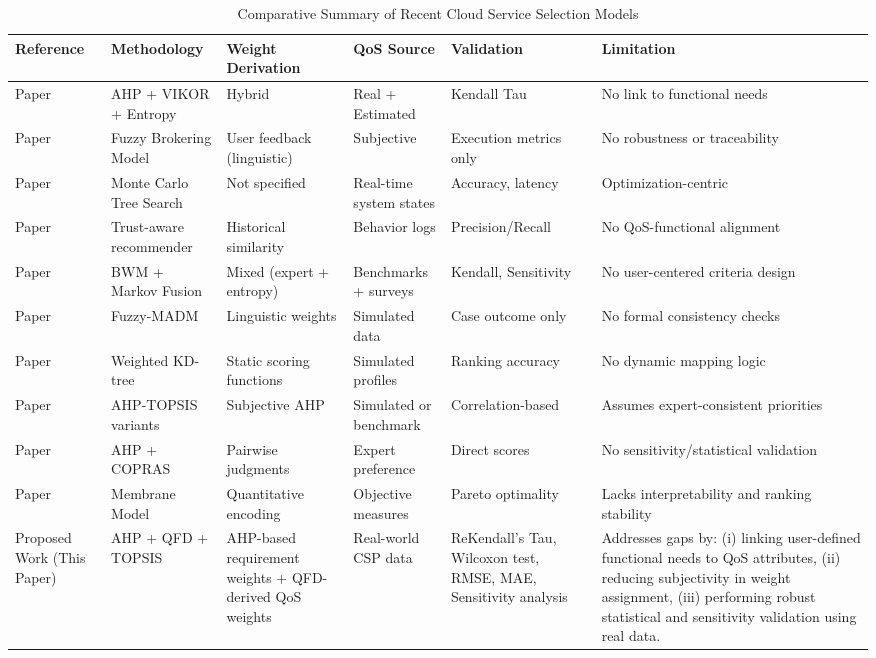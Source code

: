 \documentclass[twocolumn]{svjour3}
\begin{document}
\begin{table}[t]
\centering
\caption{Comparative Summary of Recent Cloud Service Selection Models}
\label{tab:comparison}
\scriptsize
\begin{tabular}{|p{2.9cm}|p{2.5cm}|p{2.1cm}|p{2.1cm}|p{2.3cm}|p{2.2cm}|}
\hline
\textbf{Reference} & \textbf{Methodology} & \textbf{Weight Derivation} & \textbf{QoS Source} & \textbf{Validation} & \textbf{Limitation} \\
\hline
Paper ~\cite{bhol2024machine} & AHP + VIKOR + Entropy & Hybrid & Real + Estimated & Kendall Tau & No link to functional needs \\
\hline
Paper~\cite{chauhan2025fbm} & Fuzzy Brokering Model & User feedback (linguistic) & Subjective & Execution metrics only & No robustness or traceability \\
\hline
Paper ~\cite{li2023multi} & Monte Carlo Tree Search & Not specified & Real-time system states & Accuracy, latency & Optimization-centric \\
\hline
Paper ~\cite{tang2024two} & Trust-aware recommender & Historical similarity & Behavior logs & Precision/Recall & No QoS-functional alignment \\
\hline
Paper~\cite{hussain2022cloud} & BWM + Markov Fusion & Mixed (expert + entropy) & Benchmarks + surveys & Kendall, Sensitivity & No user-centered criteria design \\
\hline
Paper~\cite{gireesha2022fuzzy} & Fuzzy-MADM & Linguistic weights & Simulated data & Case outcome only & No formal consistency checks \\
\hline
Paper~\cite{bi2022cloud} & Weighted KD-tree & Static scoring functions & Simulated profiles & Ranking accuracy & No dynamic mapping logic \\
\hline
Paper~\cite{tomar2023decision} & AHP-TOPSIS variants & Subjective AHP & Simulated or benchmark & Correlation-based & Assumes expert-consistent priorities \\
\hline
Paper~\cite{kumar2017prioritizing}} & AHP + COPRAS & Pairwise judgments & Expert preference & Direct scores & No sensitivity/statistical validation \\
\hline
Paper ~\cite{raghavan2021membrane} & Membrane Model & Quantitative encoding & Objective measures & Pareto optimality & Lacks interpretability and ranking stability \\
\hline
Proposed Work (This Paper) & AHP + QFD + TOPSIS & AHP-based requirement weights + QFD-derived QoS weights &Real-world CSP data & ReKendall’s Tau, Wilcoxon test, RMSE, MAE, Sensitivity analysis & Addresses gaps by: (i) linking user-defined functional needs to QoS attributes, (ii) reducing subjectivity in weight assignment, (iii) performing robust statistical and sensitivity validation using real data. \\
\hline
\end{tabular}
\end{table}
\end{document}
